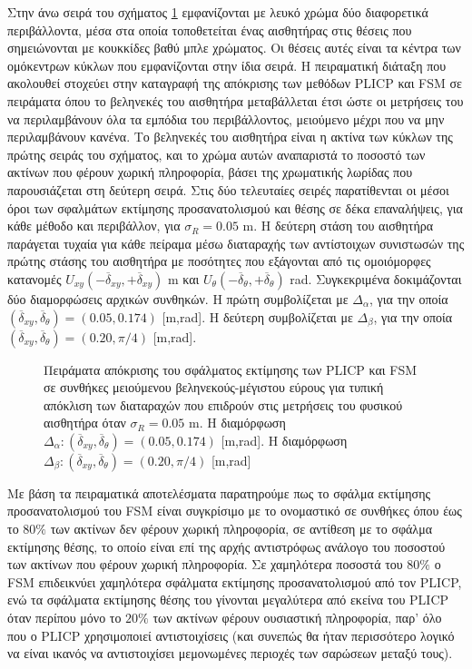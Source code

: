 Στην άνω σειρά του σχήματος \ref{fig:02_05_04:03} εμφανίζονται με λευκό χρώμα
δύο διαφορετικά περιβάλλοντα, μέσα στα οποία τοποθετείται ένας αισθητήρας στις
θέσεις που σημειώνονται με κουκκίδες βαθύ μπλε χρώματος. Οι θέσεις αυτές είναι
τα κέντρα των ομόκεντρων κύκλων που εμφανίζονται στην ίδια σειρά. Η πειραματική
διάταξη που ακολουθεί στοχεύει στην καταγραφή της απόκρισης των μεθόδων
PLICP και FSM σε πειράματα όπου το βεληνεκές του αισθητήρα
μεταβάλλεται έτσι ώστε οι μετρήσεις του να περιλαμβάνουν όλα τα εμπόδια του
περιβάλλοντος, μειούμενο μέχρι που να μην περιλαμβάνουν κανένα. Το βεληνεκές
του αισθητήρα είναι η ακτίνα των κύκλων της πρώτης σειράς του σχήματος, και το
χρώμα αυτών αναπαριστά το ποσοστό των ακτίνων που φέρουν χωρική πληροφορία,
βάσει της χρωματικής λωρίδας που παρουσιάζεται στη δεύτερη σειρά. Στις δύο
τελευταίες σειρές παρατίθενται οι μέσοι όροι των σφαλμάτων εκτίμησης
προσανατολισμού και θέσης σε δέκα επαναλήψεις, για κάθε μέθοδο και περιβάλλον,
για $\sigma_R = 0.05$ m. Η δεύτερη στάση του αισθητήρα παράγεται τυχαία για
κάθε πείραμα μέσω διαταραχής των αντίστοιχων συνιστωσών της πρώτης στάσης του
αισθητήρα με ποσότητες που εξάγονται από τις ομοιόμορφες κατανομές
$U_{xy}(-\overline{\delta}_{xy},+\overline{\delta}_{xy})$ m και
$U_{\theta}(-\overline{\delta}_{\theta},+\overline{\delta}_{\theta})$ rad.
Συγκεκριμένα δοκιμάζονται δύο διαμορφώσεις αρχικών συνθηκών. H πρώτη
συμβολίζεται με $\Delta_\alpha$, για την οποία
$(\overline{\delta}_{xy}, \overline{\delta}_{\theta}) = (0.05,0.174)$ [m,rad].
Η δεύτερη συμβολίζεται με $\Delta_\beta$, για την οποία
$(\overline{\delta}_{xy},\overline{\delta}_{\theta}) = (0.20,\pi/4)$ [m,rad].

\begin{figure}[]\centering
  
  \vspace{-2cm}
  \caption{\small Πειράματα απόκρισης του σφάλματος εκτίμησης των PLICP
           και FSM σε συνθήκες μειούμενου βεληνεκούς-μέγιστου εύρους
           για τυπική απόκλιση των διαταραχών που επιδρούν στις μετρήσεις του
           φυσικού αισθητήρα όταν $\sigma_R = 0.05$ m. Η διαμόρφωση
           $\Delta_\alpha: (\overline{\delta}_{xy}, \overline{\delta}_{\theta})
           = (0.05,0.174)$ [m,rad]. Η διαμόρφωση $\Delta_\beta:
           (\overline{\delta}_{xy},\overline{\delta}_{\theta}) = (0.20,\pi/4)$
           [m,rad]}
  \label{fig:02_05_04:03}
\end{figure}

Με βάση τα πειραματικά αποτελέσματα παρατηρούμε πως το σφάλμα εκτίμησης
προσανατολισμού του FSM είναι συγκρίσιμο με το ονομαστικό σε συνθήκες
όπου έως το $80\%$ των ακτίνων δεν φέρουν χωρική πληροφορία, σε αντίθεση με το
σφάλμα εκτίμησης θέσης, το οποίο είναι επί της αρχής αντιστρόφως ανάλογο του
ποσοστού των ακτίνων που φέρουν χωρική πληροφορία. Σε χαμηλότερα ποσοστά του
$80\%$ ο FSM επιδεικνύει χαμηλότερα σφάλματα εκτίμησης προσανατολισμού
από τον PLICP, ενώ τα σφάλματα εκτίμησης θέσης του γίνονται μεγαλύτερα από
εκείνα του PLICP όταν περίπου μόνο το $20\%$ των ακτίνων φέρουν ουσιαστική
πληροφορία, παρ' όλο που ο PLICP χρησιμοποιεί αντιστοιχίσεις (και συνεπώς θα
ήταν περισσότερο λογικό να είναι ικανός να αντιστοιχίσει μεμονωμένες περιοχές
των σαρώσεων μεταξύ τους).

